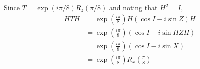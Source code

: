 \begingroup
\newcommand{\roto}[2]{R_{#1} \left( #2 \right)}
\newcommand{\expo}[1]{\exp \left( #1 \right)}
%
\par Since $T = \expo{i \pi / 8} \roto{z}{\pi / 8}$ and noting that $H^2 = I$,
%
\begin{align*}
H T H &= \expo{\frac{i \pi}{8}} H \left( \cos I - i \sin Z \right) H \\
&= \expo{\frac{i \pi}{8}} \left( \cos I - i \sin H Z H \right) \\
&= \expo{\frac{i \pi}{8}} \left( \cos I - i \sin X \right) \\
&= \expo{\frac{i \pi}{8}} \roto{x}{\frac{\pi}{8}}
\end{align*}
\endgroup

